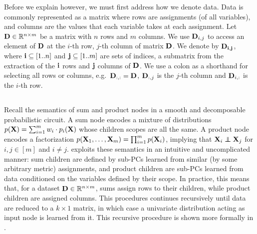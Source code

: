 Before we explain  however, we must first address how we denote data. Data is
commonly represented as a matrix where rows are assignments (of all variables), and columns are the
values that each variable takes at each assignment. Let $\mathbf{D}\in\mathbb{R}^{n \times m}$ be a
matrix with $n$ rows and $m$ columns. We use $\mathbf{D}_{i,j}$ to access an element of $\mathbf{D}$ at
the $i$-th row, $j$-th column of matrix $\mathbf{D}$. We denote by $\mathbf{D}_{\mathbf{i},\mathbf{j}}$, where
$\mathbf{i}\subseteq \left[1..n\right]$ and $\mathbf{j}\subseteq\left[1..m\right]$ are sets of indices, a
submatrix from the extraction of the $\mathbf{i}$ rows and $\mathbf{j}$ columns of $\mathbf{D}$. We use a
colon as a shorthand for selecting all rows or columns, e.g.\ $\mathbf{D}_{:,:}=\mathbf{D}$,
$\mathbf{D}_{:,j}$ is the $j$-th column and $\mathbf{D}_{i,:}$ is the $i$-th row.

\subsection{}
\label{sec:learnspn}

Recall the semantics of sum and product nodes in a smooth and decomposable probabilistic circuit.
A sum node encodes a mixture of distributions $p(\mathbf{X})=\sum_{i=1}^m w_i\cdot p_i(\mathbf{X})$ whose
children scopes are all the same. A product node encodes a factorization
$p(\mathbf{X}_1,\ldots,\mathbf{X}_m)=\prod_{i=1}^m p(\mathbf{X}_i)$, implying that
$\set{X}_i\indep\set{X}_j$ for $i,j\in [m]$ and $i\neq j$.  \citep{gens13}
exploits these semantics in an intuitive and uncomplicated manner: sum children are defined by
sub-PCs learned from similar (by some arbitrary metric) assignments, and product children are
sub-PCs learned from data conditioned on the variables defined by their scope. In practice, this
means that, for a dataset $\mathbf{D}\in\mathbb{R}^{n\times m}$, sums assign rows to their children,
while product children are assigned columns. This procedures continues recursively until data are
reduced to a $k\times 1$ matrix, in which case a univariate distribution acting as input node is
learned from it. This recursive procedure is shown more formally in .

